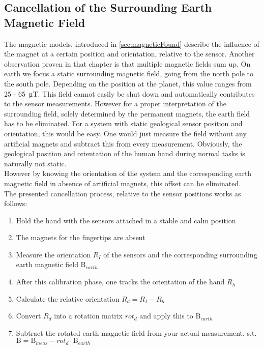 \subsection{Cancellation of the Surrounding Earth Magnetic Field} \label{subsec:earthEli}

The magnetic models, introduced in \ref{sec:magneticFound} describe the influence of the magnet at a certain position and orientation, relative to the sensor. Another observation proven in that chapter is that multiple magnetic fields sum up. On earth we focus a static surrounding magnetic field, going from the north pole to the south pole. Depending on the position at the planet, this value ranges from 25 - \SI{65}{\micro \tesla}. This field cannot easily be shut down and automatically contributes to the sensor measurements. However for a proper interpretation of the surrounding field, solely determined by the permanent magnets, the earth field has to be eliminated. For a system with static geological sensor position and orientation, this would be easy. One would just measure the field without any artificial magnets and subtract this from every measurement. Obviously, the geological position and orientation of the human hand during normal tasks is naturally not static.\\
However by knowing the orientation of the system and the corresponding earth magnetic field in absence of artificial magnets, this offset can be eliminated.\\
The presented cancellation process, relative to the sensor positions works as follows:\\
\begin{enumerate}
\item Hold the hand with the sensors attached in a stable and calm position
\item The magnets for the fingertips are absent
\item Measure the orientation $ R_{I} $ of the sensors and the corresponding surrounding earth magnetic field $ \mathrm{B}_{earth} $
\item After this calibration phase, one tracks the orientation of the hand $ R_{h} $
\item Calculate the relative orientation $ R_{d} = R_{I} - R_{h} $
\item Convert $ R_{d} $ into a rotation matrix $ rot_{d} $ and apply this to $ \mathrm{B}_{earth} $
\item Subtract the rotated earth magnetic field from your actual measurement, s.t. \\ $ \mathrm{B} = \mathrm{B}_{meas} - rot_{d} \cdot \mathrm{B}_{earth} $
\end{enumerate}
